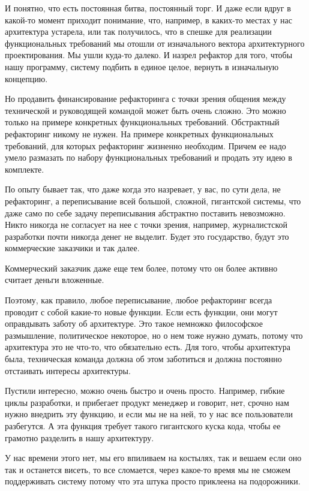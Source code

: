 И понятно, что есть постоянная битва, постоянный торг. И даже если вдруг в какой-то момент приходит понимание, что, например, в каких-то местах у нас архитектура устарела, или так получилось, что в спешке для реализации функциональных требований мы отошли от изначального вектора архитектурного проектирования. Мы ушли куда-то далеко. И назрел рефактор для того, чтобы нашу программу, систему подбить в единое целое, вернуть в изначальную концепцию.

Но продавить финансирование рефакторинга с точки зрения общения между технической и руководящей командой может быть очень сложно. Это можно только на примере конкретных функциональных требований. Обстрактный рефакторинг никому не нужен. На примере конкретных функциональных требований, для которых рефакторинг жизненно необходим. Причем ее надо умело размазать по набору функциональных требований и продать эту идею в комплекте.

По опыту бывает так, что даже когда это назревает, у вас, по сути дела, не рефакторинг, а переписывание всей большой, сложной, гигантской системы, что даже само по себе задачу переписывания абстрактно поставить невозможно. Никто никогда не согласует на нее с точки зрения, например, журналистской разработки почти никогда денег не выделит. Будет это государство, будут это коммерческие заказчики и так далее.

Коммерческий заказчик даже еще тем более, потому что он более активно считает деньги вложенные.

Поэтому, как правило, любое переписывание, любое рефакторинг всегда проводит с собой какие-то новые функции. Если есть функции, они могут оправдывать заботу об архитектуре. Это такое немножко философское размышление, политическое некоторое, но о нем тоже нужно думать, потому что архитектура это не что-то, что обязательно есть. Для того, чтобы архитектура была, техническая команда должна об этом заботиться и должна постоянно отстаивать интересы архитектуры.

Пустили интересно, можно очень быстро и очень просто. Например, гибкие циклы разработки, и прибегает продукт менеджер и говорит, нет, срочно нам нужно внедрить эту функцию, и если мы не на ней, то у нас все пользователи разбегутся. А эта функция требует такого гигантского куска кода, чтобы ее грамотно разделить в нашу архитектуру.

У нас времени этого нет, мы его впиливаем на костылях, так и вешаем если оно так и останется висеть, то все сломается, через какое-то время мы не сможем поддерживать систему потому что эта штука просто приклеена на подорожники.

